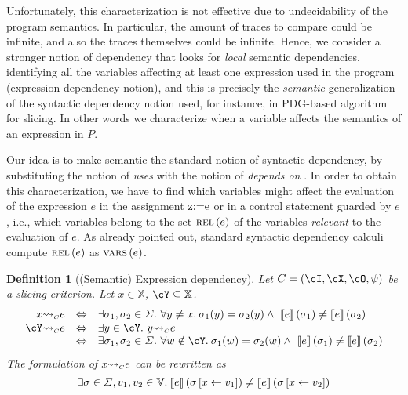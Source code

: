 \documentclass[prodmode,acmtocl]{acmsmall}
\def\prog{\ensuremath{P}\xspace}
\def\state{\ensuremath{\sigma}\xspace}
\def\states{\ensuremath{\Sigma}\xspace}
\def\variables{\ensuremath{\mathbb{X}}\xspace}
\def\values{\ensuremath{\mathbb{V}}\xspace}
\def\crit{\ensuremath{C}\xspace}
\def\ok#1{\mbox{\raisebox{0ex}[1ex][1ex]{$#1$}}}
\newcommand{\0}{\mbox{\bf 0}}
\newtheorem{mydefinition}[theorem]{Definition}
\def\ok#1{\mbox{\raisebox{0ex}[1ex][1ex]{$#1$}}}
\newcommand{\UNARYFUNCTION}[2]{#1\ifthenelse{\equal{#2}{}}{}{\left(#2\right)}}
\newcommand{\BINARYINFIXFUNCTION}[3]{\ifthenelse{\equal{#2}{}}{}{#2} #1 \ifthenelse{\equal{#3}{}}{}{#3}}
\newcommand{\CODE}[1]{\ensuremath{\mbox{\lstinline!#1!}\xspace}\xspace}
\newcommand{\UPDATE}[3]{#1\left[#2 \leftarrow #3\right]}
\newcommand{\VARS}[1]{\UNARYFUNCTION{\textsc{vars}}{#1}}
\newcommand{\SEMANTICS}[1]{\left\llbracket #1 \right\rrbracket}
\def\exp{e}
\newcommand{\CDEPENDS}[3]{\BINARYINFIXFUNCTION{{\rightsquigarrow}_{\mbox{\tiny\sc $#1$}}}{#2}{#3}}
\newcommand{\RELEVANT}[1]{\UNARYFUNCTION{\textsc{rel}}{#1}}
\newcommand{\EVAL}[2]{\ok{\UNARYFUNCTION{\SEMANTICS{#1}}{#2}}}
\begin{document}
Unfortunately, this characterization is not effective due to
undecidability of the program semantics.
In particular, the amount of traces to compare could be infinite, and
also the traces themselves could be infinite. Hence, we consider a
stronger notion of dependency that looks for {\em local} semantic
dependencies, identifying all the variables affecting at least one
expression used in the program (expression dependency notion), and
this is precisely the {\em semantic} generalization of the syntactic
dependency notion used, for instance, in PDG-based algorithm for
slicing.  In other words we characterize when a variable affects the
semantics of an expression in $\prog$.

Our idea is to make semantic the standard notion of syntactic
dependency, by substituting the notion of \emph{uses} with the notion
of \emph{depends on} \cite{GiacobazziJM12}.  In order to obtain this
characterization, we have to find which variables might affect the
evaluation of the expression $\exp$ in the assignment \CODE{z:=e} or
in a control statement guarded by $\exp$, i.e., which variables belong
to the set $\RELEVANT{\exp}$ of the variables \emph{relevant} to the
evaluation of $\exp$.  As already pointed out, standard syntactic
dependency calculi compute $\RELEVANT{\exp}$ as $\VARS{\exp}$.
\begin{mydefinition}[(Semantic) Expression dependency]
  \label{def:concreteDependencies}
  Let $\crit=(\cI,\cX,\cO,\psi)$ be a slicing criterion.  Let $x\in
  \variables$, $\cY \subseteq \variables$.
    \[
    \begin{array}{rcl} \CDEPENDS{\crit}{x}{\exp} & \Leftrightarrow & \exists
      \state_1,\state_2\in\states.\ \forall y\neq
      x.\:\state_1(y)=\state_2(y) 
       \wedge\ \EVAL{\exp}{\state_1} \neq \EVAL{\exp}{\state_2} \\
      \CDEPENDS{\crit}{\cY}{\exp}& \Leftrightarrow &\exists y \in \cY.\
      \CDEPENDS{\crit}{y}{\exp} \\
      & \Leftrightarrow & \exists
      \state_1,\state_2\in\states.\ \forall w\notin
      \cY.\:\state_1(w)=\state_2(w) 
       \wedge\ \EVAL{\exp}{\state_1} \neq \EVAL{\exp}{\state_2} \\
    \end{array}
    \]
  The formulation of $\CDEPENDS{\crit}{x}{\exp}$ can be rewritten as
  \[
  \exists\state\in\states,
  v_1,v_2\in\values.\: \EVAL{\exp}{\UPDATE{\state}{x}{v_1}} \neq
  \EVAL{\exp}{\UPDATE{\state}{x}{v_2}}
  \]
\end{mydefinition}
\end{document}
